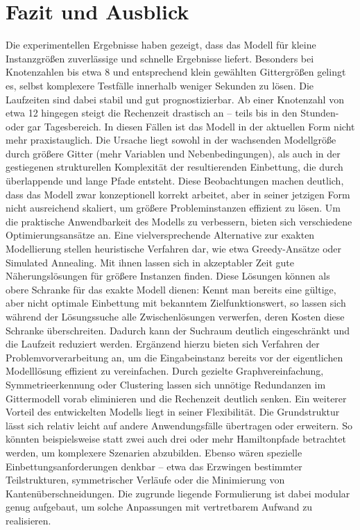 \documentclass[bachelor, german]{algothesis}
\begin{document}
\chapter{Fazit und Ausblick}
Die experimentellen Ergebnisse haben gezeigt, dass das Modell für kleine Instanzgrößen zuverlässige und schnelle Ergebnisse liefert. Besonders bei Knotenzahlen bis etwa 8 und entsprechend klein gewählten Gittergrößen gelingt es, selbst komplexere Testfälle innerhalb weniger Sekunden zu lösen. Die Laufzeiten sind dabei stabil und gut prognostizierbar. Ab einer Knotenzahl von etwa 12 hingegen steigt die Rechenzeit drastisch an – teils bis in den Stunden- oder gar Tagesbereich. In diesen Fällen ist das Modell in der aktuellen Form nicht mehr praxistauglich. Die Ursache liegt sowohl in der wachsenden Modellgröße durch größere Gitter (mehr Variablen und Nebenbedingungen), als auch in der gestiegenen strukturellen Komplexität der resultierenden Einbettung, die durch überlappende und lange Pfade entsteht.\newline 
Diese Beobachtungen machen deutlich, dass das Modell zwar konzeptionell korrekt arbeitet, aber in seiner jetzigen Form nicht ausreichend skaliert, um größere Probleminstanzen effizient zu lösen.\newline
Um die praktische Anwendbarkeit des Modells zu verbessern, bieten sich verschiedene Optimierungsansätze an. Eine vielversprechende Alternative zur exakten Modellierung stellen heuristische  Verfahren dar, wie etwa Greedy-Ansätze oder Simulated Annealing. Mit ihnen lassen sich in akzeptabler Zeit gute Näherungslösungen für größere Instanzen finden. Diese Lösungen können als obere Schranke für das exakte Modell dienen: Kennt man bereits eine gültige, aber nicht optimale Einbettung mit bekanntem Zielfunktionswert, so lassen sich während der Lösungssuche alle Zwischenlösungen verwerfen, deren Kosten diese Schranke überschreiten. Dadurch kann der Suchraum deutlich eingeschränkt und die Laufzeit reduziert werden. Ergänzend hierzu bieten sich Verfahren der Problemvorverarbeitung an, um die Eingabeinstanz bereits vor der eigentlichen Modelllösung effizient zu vereinfachen. Durch gezielte Graphvereinfachung, Symmetrieerkennung oder Clustering lassen sich unnötige Redundanzen im Gittermodell vorab eliminieren und die Rechenzeit deutlich senken.\newline
Ein weiterer Vorteil des entwickelten Modells liegt in seiner Flexibilität. Die Grundstruktur lässt sich relativ leicht auf andere Anwendungsfälle übertragen oder erweitern. So könnten beispielsweise statt zwei auch drei oder mehr Hamiltonpfade betrachtet werden, um komplexere Szenarien abzubilden. Ebenso wären spezielle Einbettungsanforderungen denkbar – etwa das Erzwingen bestimmter Teilstrukturen, symmetrischer Verläufe oder die Minimierung von Kantenüberschneidungen. Die zugrunde liegende Formulierung ist dabei modular genug aufgebaut, um solche Anpassungen mit vertretbarem Aufwand zu realisieren.\newline 
\end{document}
